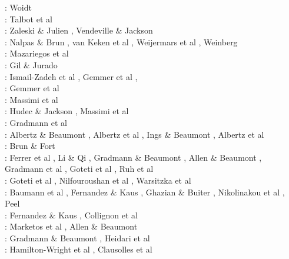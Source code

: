 \begin{scriptsize}
\nineteenseventyeight: Woidt \cite{woid78}\\
\nineteenninetyone: Talbot et al \cite{tars91}\\
\nineteenninetytwo: Zaleski \& Julien \cite{zaju92},  Vendeville \& Jackson \cite{veja92}\\
\nineteenninetythree: Nalpas \& Brun \cite{nabr93}, van Keken et al \cite{vasv93}, 
                      Weijermars et al \cite{wejv93}, Weinberg \cite{wein93}\\
\nineteenninetysix: Mazariegos et al \cite{maar96}\\
\nineteenninetyeight: Gil \& Jurado \cite{giju98}\\
\twothousandfour: Ismail-Zadeh et al \cite{istt04}, Gemmer et al \cite{geim04}, \cite{mcmg04}\\
\twothousandfive: Gemmer et al \cite{gebi05}\\
\twothousandsix: Massimi et al \cite{maqs06}\\
\twothousandseven: Hudec \& Jackson \cite{huja07}, Massimi et al \cite{maqs07}\\
\twothousandnine: Gradmann  et al \cite{grba09}\\
\twothousandten: Albertz \& Beaumont \cite{albe10}, Albertz et al \cite{albi10}, 
                 Ings \& Beaumont \cite{inbe10,inbe10b}, Albertz et al \cite{albs10}\\
\twothousandeleven: Brun \& Fort \cite{brfo11}\\
\twothousandtwelve: Ferrer et al \cite{fejr12}, Li \& Qi \cite{liqi12}, Gradmann \& Beaumont \cite{grbe12},
                    Allen \& Beaumont \cite{albe12}, Gradmann et al \cite{grbi12},
                    Goteti et al \cite{goib12}, Ruh et al \cite{rukb12}\\
\twothousandthirteen: Goteti et al \cite{gobi13}, Nilfouroushan et al \cite{nipc13}, 
                      Warsitzka et al \cite{wakk13}\\
\twothousandfourteen: Baumann et al \cite{bakp14}, Fernandez \& Kaus \cite{feka14a,feka14b},
                      Ghazian \& Buiter \cite{ghbu14}, Nikolinakou et al \cite{nifh14}, Peel \cite{peel14}\\
\twothousandfifteen: Fernandez \& Kaus \cite{feka15}, Collignon et al \cite{cofk15}\\
\twothousandsixteen: Marketos et al \cite{masg16}, Allen \& Beaumont \cite{albe16}\\
\twothousandseventeen: Gradmann \& Beaumont \cite{grbe17}, Heidari et al \cite{henf17}\\
\twothousandnineteen: Hamilton-Wright et al \cite{hadv19}, Clausolles et al \cite{clcc19}
\end{scriptsize}

